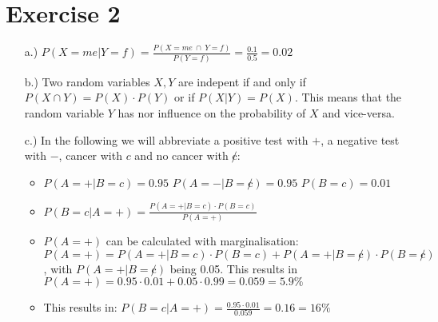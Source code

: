 \documentclass[%
   10pt,              %
   a4paper,           %
   DIV10,             %
]{scrartcl}%
\begin{document}
\section*{Exercise 2}
\begin{itemize}
	\item[a.)] $P(X=me|Y=f) = \frac{P(X=me~\cap~Y=f)}{P(Y=f)} = \frac{0.1}{0.5} = 0.02$
	\item[b.)] Two random variables $X,Y$ are indepent if and only if $P(X \cap Y) = P(X) \cdot P(Y)$ or if $P(X|Y) = P(X)$. This means that the random variable $Y$ has nor influence on the probability of $X$ and vice-versa.
	\item[c.)] In the following we will abbreviate a positive test with $+$, a negative test with $-$, cancer with $c$ and no cancer with $\not c$:
	\begin{itemize}
		\item $P(A=+|B=c) = 0.95$\newline
		\noindent $P(A=-|B=\not c) = 0.95$\newline
		\noindent $P(B=c) = 0.01$
		\item $P(B=c|A=+) = \frac{P(A=+|B=c) \cdot P(B=c)}{P(A=+)}$
		\item $P(A=+)$ can be calculated with marginalisation:\newline
		\noindent $P(A=+) = P(A=+|B=c) \cdot P(B=c) + P(A=+|B=\not c) \cdot P(B=\not c)$, with $P(A=+|B=\not c)$ being 0.05. This results in $P(A=+) = 0.95 \cdot 0.01 + 0.05 \cdot 0.99 = 0.059 = 5.9\%$
		\item This results in: $P(B=c|A=+) = \frac{0.95 \cdot 0.01}{0.059} = 0.16 = 16\%$
	\end{itemize}
\end{itemize}
\end{document}
